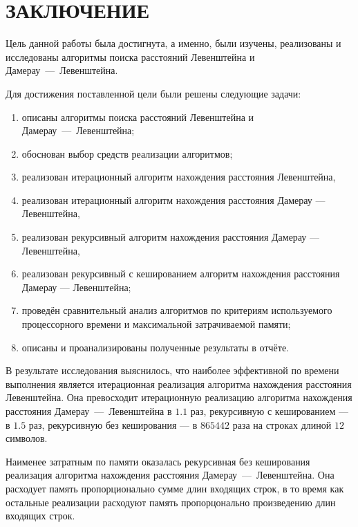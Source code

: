 \section*{ЗАКЛЮЧЕНИЕ}

Цель данной работы была достигнута, а именно, были изучены, реализованы и исследованы алгоритмы поиска расстояний Левенштейна и Дамерау~---~Левенштейна.

Для достижения поставленной цели были решены следующие задачи:
\begin{enumerate}
    \item описаны алгоритмы поиска расстояний Левенштейна и Дамерау~---~Левенштейна;
    \item обоснован выбор средств реализации алгоритмов;
    \item реализован итерационный алгоритм нахождения расстояния Левенштейна,
    \item реализован итерационный алгоритм нахождения расстояния Дамерау --- Левенштейна,
    \item реализован рекурсивный алгоритм нахождения расстояния Дамерау --- Левенштейна,
    \item реализован рекурсивный с кешированием алгоритм нахождения расстояния Дамерау --- Левенштейна;
    \item проведён сравнительный анализ алгоритмов по критериям используемого процессорного времени и максимальной затрачиваемой памяти;
    \item описаны и проанализированы полученные результаты в отчёте.
\end{enumerate}

В результате исследования выяснилось, что наиболее эффективной по времени выполнения является итерационная реализация алгоритма нахождения расстояния Левенштейна.
Она превосходит итерационную реализацию алгоритма нахождения расстояния Дамерау~---~Левенштейна в $1.1$ раз, рекурсивную с кешированием --- в $1.5$ раз, рекурсивную без кеширования --- в $865442$ раза на строках длиной $12$ символов.

Наименее затратным по памяти оказалась рекурсивная без кеширования реализация алгоритма нахождения расстояния Дамерау~---~Левенштейна.
Она расходует память пропорционально сумме длин входящих строк, в то время как остальные реализации расходуют память пропорцонально произведению длин входящих строк.
